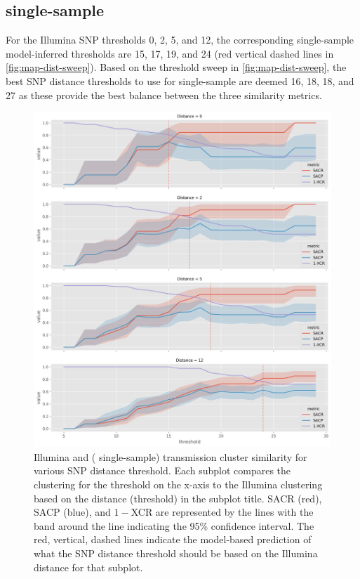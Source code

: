 \subsection{\pandora{} single-sample}

For the Illumina SNP thresholds 0, 2, 5, and 12, the corresponding \pandora{} single-sample model-inferred thresholds are 15, 17, 19, and 24 (red vertical dashed lines in \autoref{fig:map-dist-sweep}). Based on the threshold sweep in \autoref{fig:map-dist-sweep}, the best SNP distance thresholds to use for \pandora{} single-sample are deemed 16, 18, 18, and 27 as these provide the best balance between the three similarity metrics.

\begin{figure}
\begin{center}
\includegraphics[width=0.90\columnwidth]{Appendix1/Figs/map-threshold-sweep.png}
\caption{{Illumina and \ont{} (\pandora{} single-sample) transmission cluster similarity for various SNP distance threshold. Each subplot compares the \ont{} clustering for the threshold on the x-axis to the Illumina clustering based on the distance (threshold) in the subplot title. SACR (red), SACP (blue), and $1-$XCR are represented by the lines with the band around the line indicating the 95\% confidence interval. The red, vertical, dashed lines indicate the model-based prediction of what the \ont{} SNP distance threshold should be based on the Illumina distance for that subplot.
{\label{fig:map-dist-sweep}}%
}}
\end{center}
\end{figure}

